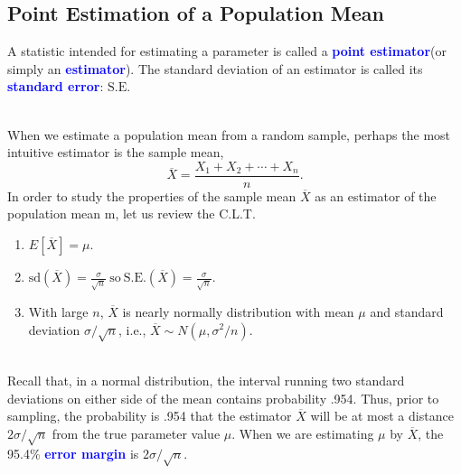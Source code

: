 \documentclass[12pt,a4paper]{article}
\newcommand{\dispsty}{\displaystyle}
\newcommand{\sd}{\text{sd}}
\newcommand{\SE}{\text{S.E.}}
\begin{document}
\subsection{Point Estimation of a Population Mean}
\begin{tcolorbox}[colback=white]
	A statistic intended for estimating a parameter is called a \textcolor{blue}{\bf point estimator}(or simply an \textcolor{blue}{\bf estimator}).
	The standard deviation of an estimator is called its \textcolor{blue}{\bf standard error}: $\SE$
\end{tcolorbox}\
\\
When we estimate a population mean from a random sample, perhaps the most intuitive estimator is the sample mean,
\[
\overline{X} = \frac{X_1+X_2+\cdots+X_n}{n}.
\]
In order to study the properties of the sample mean $\overline{X}$ as an estimator of the population mean m, let us review the C.L.T. \begin{enumerate}
	\item \(E[\overline{X}]=\mu\).
	\item \(\dispsty\sd(\overline{X})=\frac{\sigma}{\sqrt{n}}\ \text{so}\ \SE(\overline{X})=\frac{\sigma}{\sqrt{n}} \).
	\item With large $n$, $\overline{X}$ is nearly normally distribution with mean $\mu$ and standard deviation $\sigma/\sqrt{n}$, i.e., $\overline{X}\sim N(\mu, \sigma^2/n)$.
\end{enumerate}\
\\
Recall that, in a normal distribution, the interval running two standard deviations on either side of the mean
contains probability .954. Thus, prior to sampling, the probability is .954 that the estimator $\overline{X}$ will be at most a distance $2\sigma/\sqrt{n}$ from the true parameter value $\mu$. When we are estimating $\mu$ by $\overline{X}$, the 95.4\% \textcolor{blue}{\bf error margin} is $2\sigma/\sqrt{n}$.
\end{document}
